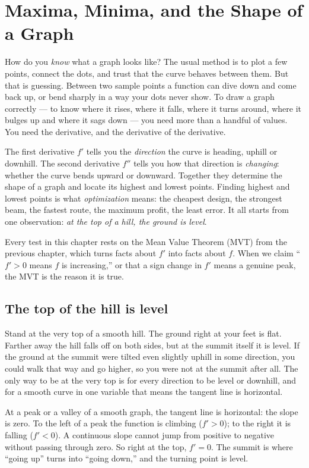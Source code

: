 \chapter{Maxima, Minima, and the Shape of a Graph}

How do you \emph{know} what a graph looks like? The usual method is to plot a
few points, connect the dots, and trust that the curve behaves between them. But
that is guessing. Between two sample points a function can dive down and come
back up, or bend sharply in a way your dots never show. To draw a graph
correctly --- to know where it rises, where it falls, where it turns around,
where it bulges up and where it sags down --- you need more than a handful of
values. You need the derivative, and the derivative of the derivative.

The first derivative $f'$ tells you the \emph{direction} the curve is heading,
uphill or downhill. The second derivative $f''$ tells you how that direction is
\emph{changing}: whether the curve bends upward or downward. Together they
determine the shape of a graph and locate its highest and lowest points.
Finding highest and lowest points is what \emph{optimization} means: the cheapest
design, the strongest beam, the fastest route, the maximum profit, the least
error. It all starts from one observation: \emph{at the top of a hill, the
ground is level}.

Every test in this chapter rests on the Mean Value Theorem (MVT) from the
previous chapter, which turns facts about $f'$ into facts about $f$. When we
claim ``$f'>0$ means $f$ is increasing,'' or that a sign change in $f'$ means a
genuine peak, the MVT is the reason it is true.

\section{The top of the hill is level}

Stand at the very top of a smooth hill. The ground right at your feet is flat.
Farther away the hill falls off on both sides, but at the summit itself it is
level. If the ground at the summit were tilted even slightly uphill in some
direction, you could walk that way and go higher, so you were not at the
summit after all. The only way to be at the very top is for every direction to be
level or downhill, and for a smooth curve in one variable that means the tangent
line is horizontal.

\begin{intuitionbox}
At a peak or a valley of a smooth graph, the tangent line is horizontal: the
slope is zero. To the left of a
peak the function is climbing ($f'>0$); to the right it is falling ($f'<0$). A
continuous slope cannot jump from positive to negative without passing through
zero. So right at the top, $f'=0$. The summit is where ``going up'' turns into
``going down,'' and the turning point is level.
\end{intuitionbox}

